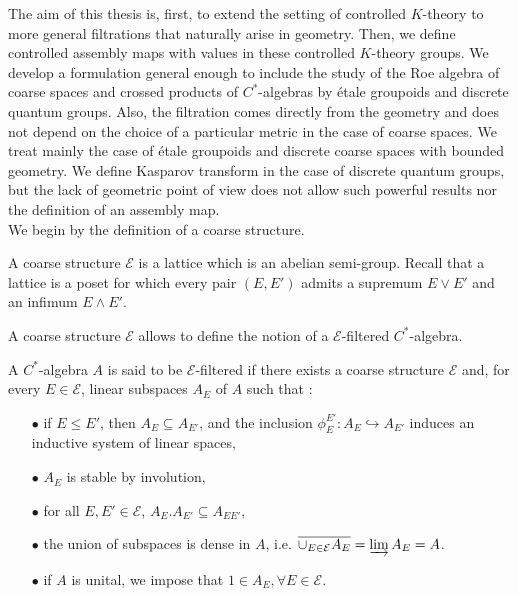 
The aim of this thesis is, first, to extend the setting of controlled $K$-theory to more general filtrations that naturally arise in geometry. Then, we define controlled assembly maps with values in these controlled $K$-theory groups. We develop a formulation general enough to include the study of the Roe algebra of coarse spaces and crossed products of $C^*$-algebras by étale groupoids and discrete quantum groups. Also, the filtration comes directly from the geometry and does not depend on the choice of a particular metric in the case of coarse spaces. We treat mainly the case of étale groupoids and discrete coarse spaces with bounded geometry. We define Kasparov transform in the case of discrete quantum groups, but the lack of geometric point of view does not allow such powerful results nor the definition of an assembly map. \\

We begin by the definition of a coarse structure. 

\begin{definition}
A coarse structure $\mathcal E$ is a lattice which is an abelian semi-group. %
Recall that a lattice is a poset for which every pair $(E,E')$ admits a supremum $E\vee E'$ and an infimum $E\wedge E'$.
\end{definition}

A coarse structure $\mathcal E$ allows to define the notion of a $\mathcal E$-filtered $C^*$-algebra. 

\begin{definition}
A $C^*$-algebra $A$ is said to be $\mathcal E$-filtered if there exists a coarse structure $\mathcal E$ and, for every $E\in \mathcal E$, linear subspaces $A_E$ of $A$ such that :\\
\begin{itemize}
\item[$\bullet$] if $E \leq E'$, then $A_E\subseteq A_{E'}$, and the inclusion $\phi_E^{E'}: A_E\hookrightarrow A_{E'}$ induces an inductive system of linear spaces,
\item[$\bullet$] $A_E$ is stable by involution,
\item[$\bullet$] for all $E,E'\in\mathcal E$, $A_E.A_{E'}\subseteq A_{EE'}$,
\item[$\bullet$] the union of subspaces is dense in $A$, i.e. $\overline{\cup_{E\in\mathcal E}A_E} = \varinjlim A_E = A$.
\item[$\bullet$] if $A$ is unital, we impose that $1\in A_E,\forall E\in\mathcal E$.
\end{itemize}
\end{definition} 

